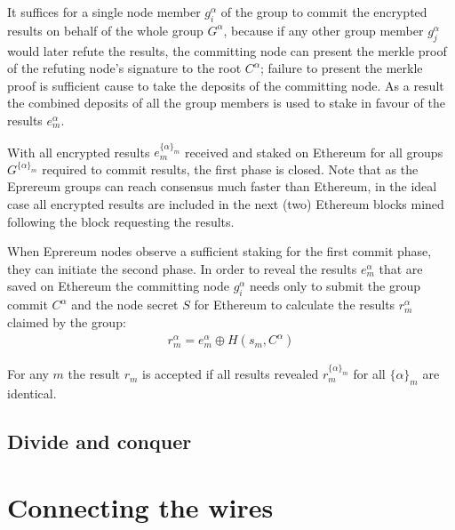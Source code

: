 \documentclass[twocolumn]{article}
\begin{document}
It suffices for a single node member $g_i^\alpha$ of the group to commit the encrypted results on behalf of the whole group $G^\alpha$, because if any other group member  $g_j^\alpha$ would later refute the results, the committing node can present the merkle proof of the refuting node's signature to the root $C^\alpha$; failure to present the merkle proof is sufficient cause to take the deposits of the committing node.  As a result the combined deposits of all the group members is used to stake in favour of the results $e^\alpha_m$.

With all encrypted results $e^{\{\alpha\}_m}_m$ received and staked on Ethereum for all groups $G^{\{\alpha\}_m}$ required to commit results, the first phase is closed.  Note that as the Eprereum groups can reach consensus much faster than Ethereum, in the ideal case all encrypted results are included in the next (two) Ethereum blocks mined following the block requesting the results.

When Eprereum nodes observe a sufficient staking for the first commit phase, they can initiate the second phase.  In order to reveal the results $e^\alpha_m$ that are saved on Ethereum the committing node $g^\alpha_i$ needs only to submit the group commit $C^\alpha$ and the node secret $S$ for Ethereum to calculate the results $r^\alpha_m$ claimed by the group:
\begin{align}
		r_m^\alpha = e_m^\alpha \oplus H(s_m, C^\alpha)
\end{align}

For any $m$ the result $r_m$ is accepted if all results revealed $r^{\{\alpha\}_m}_m$ for all $\{\alpha\}_m$ are identical.
\subsection{Divide and conquer}


\section{Connecting the wires}
\end{document}
